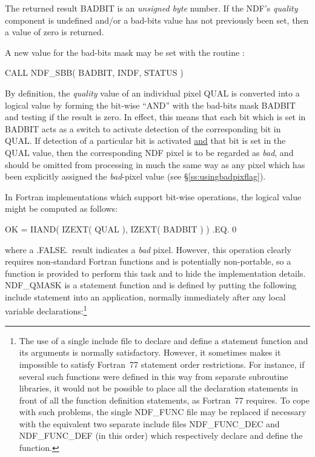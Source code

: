 \documentclass[twoside,11pt,nolof]{starlink}
\providecommand{\st}[1]{{\emph{#1}}}
\begin{document}
The returned result BADBIT is an \st{unsigned byte\/} number.
If the NDF's \st{quality\/} component is undefined and/or a bad-bits value has
not previously been set, then a value of zero is returned.

A new value for the bad-bits mask may be set with the routine :

\small
\begin{terminalv}
      CALL NDF_SBB( BADBIT, INDF, STATUS )
\end{terminalv}
\normalsize

By definition, the \st{quality\/} value of an individual pixel QUAL is
converted into a logical value by forming the bit-wise ``AND'' with the
bad-bits mask BADBIT and testing if the result is zero.
In effect, this means that each bit which is set in BADBIT acts as a switch to
activate detection of the corresponding bit in QUAL.
If detection of a particular bit is activated \underline{and} that bit is
set in the QUAL value, then the corresponding NDF pixel is to be regarded as
\st{bad}, and should be omitted from processing in much the same way as any
pixel which has been explicitly assigned the \st{bad\/}-pixel value (see
\S\ref{ss:usingbadpixflag}).

In Fortran implementations which support bit-wise operations, the
logical value might be computed as follows:

\small
\begin{terminalv}
      OK = IIAND( IZEXT( QUAL ), IZEXT( BADBIT ) ) .EQ. 0
\end{terminalv}
\normalsize

where a .FALSE.\ result indicates a \st{bad\/} pixel.
However, this operation clearly requires non-standard Fortran
functions and is potentially non-portable, so a function  is
provided to perform this task and to hide the implementation details.
NDF\_QMASK is a statement function and is defined by putting the following
include statement into an application, normally immediately after any local
variable declarations:\footnote{The use of a single include file to declare
and define a statement function and its arguments is normally satisfactory.
However, it sometimes makes it impossible to satisfy Fortran~77 statement
order restrictions.
For instance, if several such functions were defined in this way from
separate subroutine libraries, it would not be possible to place all the
declaration statements in front of all the function definition statements,
as Fortran~77 requires.
To cope with such problems, the single NDF\_FUNC file may be replaced if
necessary with the equivalent two separate include files NDF\_FUNC\_DEC and
NDF\_FUNC\_DEF (in this order) which respectively declare and define the
function.}
\end{document}

